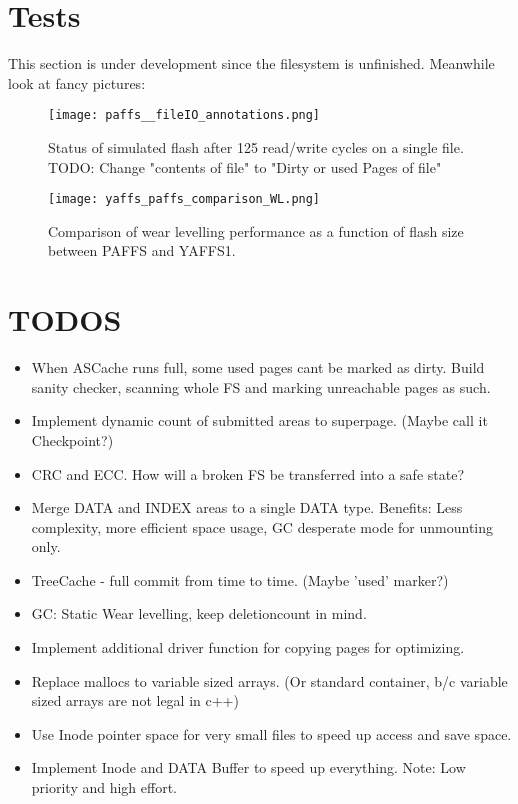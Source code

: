 \section{Tests}
\begin{flushleft}
	
\end{flushleft}
This section is under development since the filesystem is unfinished. Meanwhile look at fancy pictures:

\begin{figure}[htp]
	\centering\texttt{[image: paffs\_\_fileIO\_annotations.png]}
	\caption{\label{fig:fileIO} Status of simulated flash after 125 read/write cycles on a single file.\\TODO: Change "contents of file" to "Dirty or used Pages of file"}
\end{figure}
\begin{figure}[htp]
	\centering\texttt{[image: yaffs\_paffs\_comparison\_WL.png]}
	\caption{\label{fig:fileIOCompare} Comparison of wear levelling performance as a function of flash size between PAFFS and YAFFS1.}
\end{figure}


\appendix
\section{TODOS}
\begin{itemize}
	\item When ASCache runs full, some used pages cant be marked as dirty. Build sanity checker, scanning whole FS and marking unreachable pages as such.
	\item Implement dynamic count of submitted areas to superpage. (Maybe call it Checkpoint?)
	\item CRC and ECC. How will a broken FS be transferred into a safe state?
	\item Merge DATA and INDEX areas to a single DATA type. Benefits: Less complexity, more efficient space usage, GC desperate mode for unmounting only.
	\item TreeCache - full commit from time to time. (Maybe 'used' marker?)
	\item GC: Static Wear levelling, keep deletioncount in mind.
	\item Implement additional driver function for copying pages for optimizing.
	\item Replace mallocs to variable sized arrays. (Or standard container, b/c variable sized arrays are not legal in c++)
	\item Use Inode pointer space for very small files to speed up access and save space.
	\item Implement Inode and DATA Buffer to speed up everything. Note: Low priority and high effort.
\end{itemize}
